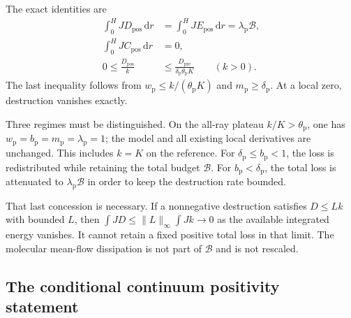 \documentclass[11pt,a4paper]{article}
\numberwithin{equation}{section}
\newcommand{\dd}{\mathrm d}
\begin{document}
The exact identities are
\begin{equation}
 \begin{aligned}
 \int_0^HJ D_{\mathrm{pos}}\,\dd r
 &=\int_0^HJ E_{\mathrm{pos}}\,\dd r
   =\lambda_{\mathrm p}\mathcal B,\\
 \int_0^HJ C_{\mathrm{pos}}\,\dd r&=0,\\
 0\le\frac{D_{\mathrm{pos}}}{k}
 &\le\frac{D_{\mathrm{pre}}}
            {\delta_{\mathrm p}\theta_{\mathrm p}K}
       \qquad(k>0).
 \end{aligned}
 \label{st:positive-budget}
\end{equation}
The last inequality follows from
$w_{\mathrm p}\le k/(\theta_{\mathrm p}K)$ and
$m_{\mathrm p}\ge\delta_{\mathrm p}$.
At a local zero, destruction vanishes exactly.

Three regimes must be distinguished. On the all-ray plateau
$k/K>\theta_{\mathrm p}$, one has
$w_{\mathrm p}=b_{\mathrm p}=m_{\mathrm p}
=\lambda_{\mathrm p}=1$; the model and all existing local
derivatives are unchanged. This includes $k=K$ on the reference.
For $\delta_{\mathrm p}\le b_{\mathrm p}<1$, the loss is redistributed
while retaining the total budget $\mathcal B$.
For $b_{\mathrm p}<\delta_{\mathrm p}$, the total loss is attenuated
to $\lambda_{\mathrm p}\mathcal B$ in order to keep the destruction
rate bounded.

That last concession is necessary. If a nonnegative destruction
satisfies $D\le Lk$ with bounded $L$, then
$\int JD\le\|L\|_\infty\int Jk\to0$ as the available integrated energy
vanishes. It cannot retain a fixed positive total loss in that
limit. The molecular mean-flow dissipation is not part of
$\mathcal B$ and is not rescaled.

\subsection{The conditional continuum positivity statement}
\label{st:positive-assumptions}
\end{document}
